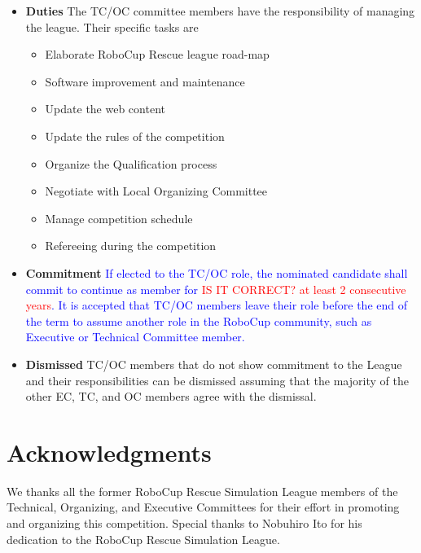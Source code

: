 \documentclass{article}
\begin{document}
\begin{itemize}
  \item \textbf{Duties} The TC/OC committee members have the responsibility of managing the league. Their specific tasks are
  \begin{itemize}
    \item Elaborate RoboCup Rescue league road-map
    \item Software improvement and maintenance
    \item Update the web content
    \item Update the rules of the competition
    \item Organize the Qualification process
    \item Negotiate with Local Organizing Committee
    \item Manage competition schedule
    \item Refereeing during the competition
  \end{itemize}
  \item \textbf{Commitment} \textcolor{blue}{If elected to the TC/OC role, the nominated candidate shall commit to continue as member for \textcolor{red}{IS IT CORRECT? at least 2 consecutive years}. It is accepted that TC/OC members leave their role before the end of the term to assume another role in the RoboCup community, such as Executive or Technical Committee member.}
  \item \textbf{Dismissed} TC/OC members that do not show commitment to the League and their responsibilities can be dismissed assuming that the majority of the other EC, TC, and OC members agree with the dismissal.
\end{itemize}
\section*{Acknowledgments}
We thanks all the former RoboCup Rescue Simulation League members of the Technical, Organizing, and Executive Committees for their effort in promoting and organizing this competition. Special thanks to Nobuhiro Ito for his dedication to the RoboCup Rescue Simulation League.
\newpage
\appendix
\end{document}

